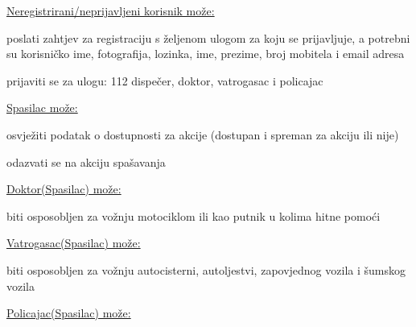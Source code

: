 			
			\begin{packed_enum}
				\item \underline{Neregistrirani/neprijavljeni korisnik može:}
				
				\begin{packed_enum}
					
					\item poslati zahtjev za registraciju s željenom ulogom za
					koju se prijavljuje, a potrebni su korisničko ime, fotografija, lozinka, ime, prezime, broj
					mobitela i email adresa\item  {}
					\item prijaviti se za ulogu: 112 dispečer, doktor,
					vatrogasac i policajac
					
				\end{packed_enum}
				
				\item \underline{Spasilac može:}
				
				\begin{packed_enum}
					
					\item osvježiti podatak o dostupnosti za akcije (dostupan i spreman za akciju ili nije)
					\item odazvati se na akciju spašavanja
					
				\end{packed_enum}
				
				\item \underline{Doktor(Spasilac) može:}
				
				\begin{packed_enum}
					
					\item biti osposobljen za vožnju motociklom ili kao putnik u kolima hitne pomoći
					
				\end{packed_enum}
				
				\item \underline{Vatrogasac(Spasilac) može:}
				
				\begin{packed_enum}
					
					\item biti osposobljen za vožnju autocisterni, autoljestvi, zapovjednog vozila i šumskog vozila
					
				\end{packed_enum}
				
				\item \underline{Policajac(Spasilac) može:}
				

\end{packed_enum}
